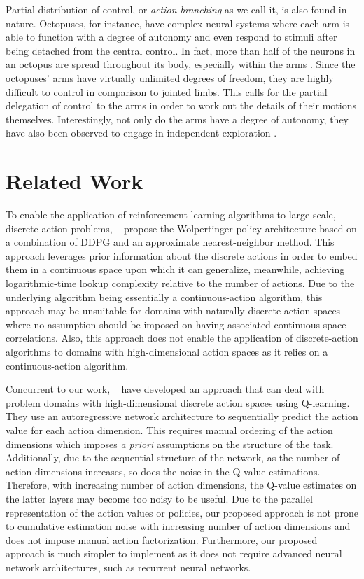 \documentclass[letterpaper]{article}
\newcommand{\citet}[1]
{\citeauthor{#1}~\shortcite{#1}}
\newcommand{\citep}{\cite}
\begin{document}
Partial distribution of control, or \textit{action branching} as we call it, is also found in nature. Octopuses, for instance, have complex neural systems where each arm is able to function with a degree of autonomy and even respond to stimuli after being detached from the central control. In fact, more than half of the neurons in an octopus are spread throughout its body, especially within the arms \citep{Godfrey:2016octopus}. Since the octopuses' arms have virtually unlimited degrees of freedom, they are highly difficult to control in comparison to jointed limbs.
This calls for the partial delegation of control to the arms in order to work out the details of their motions themselves. Interestingly, not only do the arms have a degree of autonomy, they have also been observed to engage in independent exploration \citep{Godfrey:2016octopus}.


\section{Related Work}
\label{sec:relatedwork}

To enable the application of reinforcement learning algorithms to large-scale, discrete-action problems, \citet{Dulac:2015} propose the Wolpertinger policy architecture based on a combination of DDPG and an approximate nearest-neighbor method. This approach leverages prior information about the discrete actions in order to embed them in a continuous space upon which it can generalize, meanwhile, achieving logarithmic-time lookup complexity relative to the number of actions. Due to the underlying algorithm being essentially a continuous-action algorithm, this approach may be unsuitable for domains with naturally discrete action spaces where no assumption should be imposed on having associated continuous space correlations. Also, this approach does not enable the application of discrete-action algorithms to domains with high-dimensional action spaces as it relies on a continuous-action algorithm.

Concurrent to our work, \citet{Metz:2017} have developed an approach that can deal with problem domains with high-dimensional discrete action spaces using Q-learning. They use an autoregressive network architecture to sequentially predict the action value for each action dimension. This requires manual ordering of the action dimensions which imposes \textit{a priori} assumptions on the structure of the task. Additionally, due to the sequential structure of the network, as the number of action dimensions increases, so does the noise in the Q-value estimations. Therefore, with increasing number of action dimensions, the Q-value estimates on the latter layers may become too noisy to be useful. Due to the parallel representation of the action values or policies, our proposed approach is not prone to cumulative estimation noise with increasing number of action dimensions and does not impose manual action factorization. Furthermore, our proposed approach is much simpler to implement as it does not require advanced neural network architectures, such as recurrent neural networks.
\end{document}
